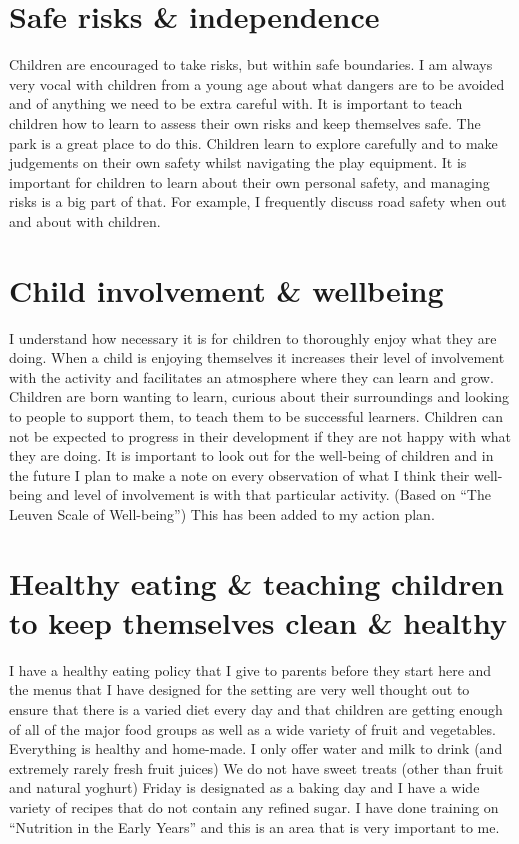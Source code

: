 \documentclass[10pt,a4paper]{report}
\begin{document}
\section{Safe risks \& independence}

Children are encouraged to take risks, but within safe boundaries. I am always very vocal with children from a young age about what dangers are to be avoided and of anything we need to be extra careful with. It is important to teach children how to learn to assess their own risks and keep themselves safe. The park is a great place to do this. Children learn to explore carefully and to make judgements on their own safety whilst navigating the play equipment. It is important for children to learn about their own personal safety, and managing risks is a big part of that. For example, I frequently discuss road safety when out and about with children. 

\section{Child involvement \& wellbeing}

I understand how necessary it is for children to thoroughly enjoy what they are doing. When a child is enjoying themselves it increases their level of involvement with the activity and facilitates an atmosphere where they can learn and grow. Children are born wanting to learn, curious about their surroundings and looking to people to support them, to teach them to be successful learners. Children can not be expected to progress in their development if they are not happy with what they are doing. It is important to look out for the well-being of children and in the future I plan to make a note on every observation of what I think their well-being and level of involvement is with that particular activity. (Based on “The Leuven Scale of Well-being”) This has been added to my action plan.

\section{Healthy eating \& teaching children to keep themselves clean \& healthy}

I have a healthy eating policy that I give to parents before they start here and the menus that I have designed for the setting are very well thought out to ensure that there is a varied diet every day and that children are getting enough of all of the major food groups as well as a wide variety of fruit and vegetables. Everything is healthy and home-made. I only offer water and milk to drink (and extremely rarely fresh fruit juices) We do not have sweet treats (other than fruit and natural yoghurt) Friday is designated as a baking day and I have a wide variety of recipes that do not contain any refined sugar. I have done training on “Nutrition in the Early Years” and this is an area that is very important to me. 
\end{document}
